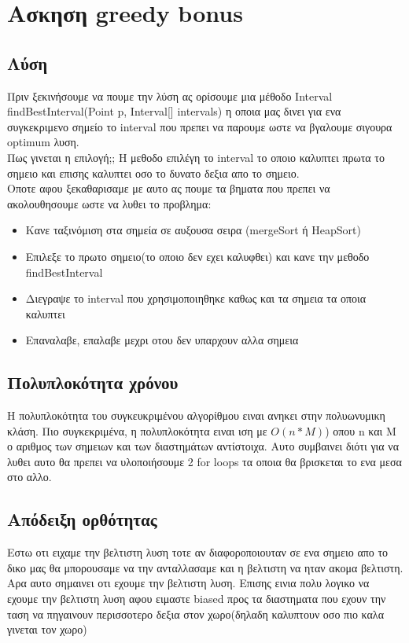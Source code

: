 \documentclass[12pt]{article}
\begin{document}
\newpage
\section{Ασκηση greedy bonus}

\subsection{Λύση}
Πριν ξεκινήσουμε να πουμε την λύση ας ορίσουμε μια μέθοδο Interval findBestInterval(Point p, Interval[] intervals) η οποια μας δινει για ενα συγκεκριμενο σημείο το interval που πρεπει να παρουμε ωστε να βγαλουμε σιγουρα optimum λυση.\\
Πως γινεται η επιλογή;; Η μεθοδο επιλέγη το interval το οποιο καλυπτει πρωτα το σημειο και επισης καλυπτει οσο το δυνατο δεξια απο το σημειο.\\
Οποτε αφου ξεκαθαρισαμε με αυτο ας πουμε τα βηματα που πρεπει να ακολουθησουμε ωστε να λυθει το προβλημα:

\begin{itemize}
	\item Κανε ταξινόμιση στα σημεία σε αυξουσα σειρα (mergeSort ή HeapSort)
	\item Επιλεξε το πρωτο σημειο(το οποιο δεν εχει καλυφθει) και κανε την μεθοδο findBestInterval
	\item Διεγραψε το interval που χρησιμοποιηθηκε καθως και τα σημεια τα οποια καλυπτει
	\item Επαναλαβε, επαλαβε μεχρι οτου δεν υπαρχουν αλλα σημεια

\end{itemize}




\subsection{Πολυπλοκότητα χρόνου} 
Η πολυπλοκότητα του συγκευκριμένου αλγορίθμου ειναι ανηκει στην πολυωνυμικη κλάση. Πιο συγκεκριμένα, η πολυπλοκότητα ειναι ιση με $O(n*Μ)$) οπου n και M ο αριθμος των σημειων και των διαστημάτων αντίστοιχα. Αυτο συμβαινει διότι για να λυθει αυτο θα πρεπει να υλοποιήσουμε 2 for loops τα οποια θα βρισκεται το ενα μεσα στο αλλο.




\subsection{Απόδειξη ορθότητας} 
Εστω οτι ειχαμε την βελτιστη λυση τοτε αν διαφοροποιουταν σε ενα σημειο απο το δικο μας θα μπορουσαμε να την ανταλλασαμε και η βελτιστη να ηταν ακομα βελτιστη.
Αρα αυτο σημαινει οτι εχουμε την βελτιστη λυση. Επισης εινια πολυ λογικο να εχουμε την βελτιστη λυση αφου ειμαστε biased προς τα διαστηματα που εχουν την ταση να πηγαινουν περισσοτερο δεξια στον χωρο(δηλαδη καλυπτουν οσο πιο καλα γινεται τον χωρο)
\end{document}
